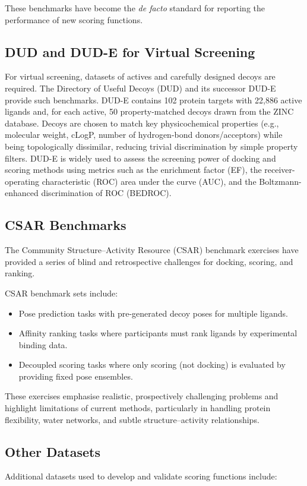\documentclass[12pt]{article}
\begin{document}
These benchmarks have become the \textit{de facto} standard for reporting the performance of new scoring functions.

\subsection{DUD and DUD-E for Virtual Screening}
For virtual screening, datasets of actives and carefully designed decoys are required. The Directory of Useful Decoys (DUD) and its successor DUD-E provide such benchmarks\cite{CH3_Mysinger2012_DUDE}. DUD-E contains 102 protein targets with 22,886 active ligands and, for each active, 50 property-matched decoys drawn from the ZINC database. Decoys are chosen to match key physicochemical properties (e.g., molecular weight, cLogP, number of hydrogen-bond donors/acceptors) while being topologically dissimilar, reducing trivial discrimination by simple property filters. DUD-E is widely used to assess the screening power of docking and scoring methods using metrics such as the enrichment factor (EF), the receiver-operating characteristic (ROC) area under the curve (AUC), and the Boltzmann-enhanced discrimination of ROC (BEDROC).

\subsection{CSAR Benchmarks}
The Community Structure--Activity Resource (CSAR) benchmark exercises have provided a series of blind and retrospective challenges for docking, scoring, and ranking\cite{CH3_CSAR2013}.

CSAR benchmark sets include:
\begin{itemize}
    \item Pose prediction tasks with pre-generated decoy poses for multiple ligands.
    \item Affinity ranking tasks where participants must rank ligands by experimental binding data.
    \item Decoupled scoring tasks where only scoring (not docking) is evaluated by providing fixed pose ensembles.
\end{itemize}

These exercises emphasise realistic, prospectively challenging problems and highlight limitations of current methods, particularly in handling protein flexibility, water networks, and subtle structure--activity relationships.

\subsection{Other Datasets}
Additional datasets used to develop and validate scoring functions include:
\end{document}

